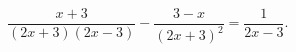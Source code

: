 \begin{ex}[type=equation]
	\begin{condition}
		$\dfrac{x + 3}{(2x + 3)(2x - 3)} - \dfrac{3 - x}{(2x + 3)^2} = \dfrac{1}{2x - 3}.$
	\end{condition}
\end{ex}